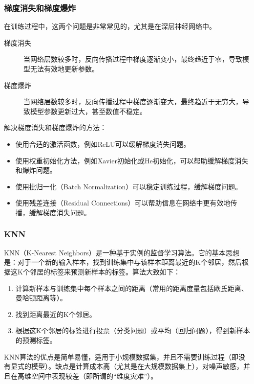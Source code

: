 \documentclass[aspectratio=1610]{ctexbeamer}
\begin{document}
\begin{frame}
    \frametitle{梯度消失和梯度爆炸}

    在训练过程中，这两个问题是非常常见的，尤其是在深层神经网络中。
    
    \begin{description}
        \item[梯度消失] 当网络层数较多时，反向传播过程中梯度逐渐变小，最终趋近于零，导致模型无法有效地更新参数。
        \item[梯度爆炸] 当网络层数较多时，反向传播过程中梯度逐渐变大，最终趋近于无穷大，导致模型参数更新过大，甚至数值不稳定。 
    \end{description}
    解决梯度消失和梯度爆炸的方法：
    \begin{itemize}
        \item 使用合适的激活函数，例如ReLU可以缓解梯度消失问题。
        \item 使用权重初始化方法，例如Xavier初始化或He初始化，可以帮助缓解梯度消失和爆炸问题。
        \item 使用批归一化（Batch Normalization）可以稳定训练过程，缓解梯度问题。
        \item 使用残差连接（Residual Connections）可以帮助信息在网络中更有效地传播，缓解梯度消失问题。
    \end{itemize}

\end{frame}

\begin{frame}
    \frametitle{KNN}

    KNN（K-Nearest Neighbors）是一种基于实例的监督学习算法。它的基本思想是：对于一个新的输入样本，找到训练集中与该样本距离最近的K个邻居，然后根据这K个邻居的标签来预测新样本的标签。算法大致如下：
\begin{enumerate}
    \item 计算新样本与训练集中每个样本之间的距离（常用的距离度量包括欧氏距离、曼哈顿距离等）。
    \item 找到距离最近的K个邻居。
    \item 根据这K个邻居的标签进行投票（分类问题）或平均（回归问题），得到新样本的预测标签。
\end{enumerate}
    KNN算法的优点是简单易懂，适用于小规模数据集，并且不需要训练过程（即没有显式的模型）。缺点是计算成本高（尤其是在大规模数据集上），对噪声敏感，并且在高维空间中表现较差（即所谓的“维度灾难”）。

\end{frame}
\end{document}
